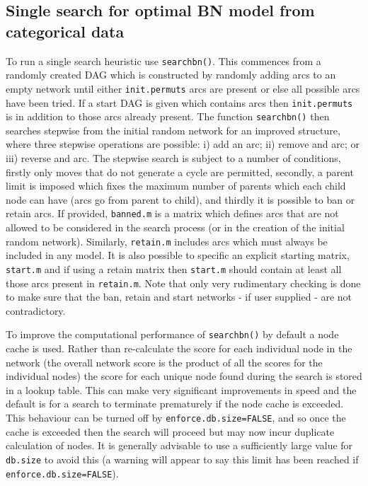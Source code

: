 \documentclass[nojss]{jss}
\begin{document}
\subsection{Single search for optimal BN model from categorical data}
To run a single search heuristic use {\tt searchbn()}. This commences from a randomly created DAG which is constructed by randomly adding arcs to an empty network until either {\tt init.permuts} arcs are present or else all possible arcs have been tried. If a start DAG is given which contains arcs then {\tt init.permuts} is in addition to those arcs already present. The function {\tt searchbn()} then searches stepwise from the initial random network for an improved structure, where three stepwise operations are possible: i) add an arc; ii) remove and arc; or iii) reverse and arc. The stepwise search is subject to a number of conditions, firstly only moves that do not generate a cycle are permitted, secondly, a parent limit is imposed which fixes the maximum number of parents which each child node can have (arcs go from parent to child), and thirdly it is possible to ban or retain arcs. If provided, {\tt banned.m} is a matrix which defines arcs that are not allowed to be considered in the search process (or in the creation of the initial random network). Similarly, {\tt retain.m} includes arcs which must always be included in any model. It is also possible to specific an explicit starting matrix, {\tt start.m} and if using a retain matrix then {\tt start.m} should contain at least all those arcs present in {\tt retain.m}. Note that only very rudimentary checking is done to make sure that the ban, retain and start networks - if user supplied - are not contradictory.

To improve the computational performance of {\tt searchbn()} by default a node cache is used. Rather than re-calculate the score for each individual node in the network (the overall network score is the product of all the scores for the individual nodes) the score for each unique node found during the search is stored in a lookup table. This can make very significant improvements in speed and the default is for a search to terminate prematurely if the node cache is exceeded. This behaviour can be turned off by {\tt enforce.db.size=FALSE}, and so once the cache is exceeded then the search will proceed but may now incur duplicate calculation of nodes. It is generally advisable to use a sufficiently large value for {\tt db.size} to avoid this (a warning will appear to say this limit has been reached if {\tt enforce.db.size=FALSE}). 
\end{document}
